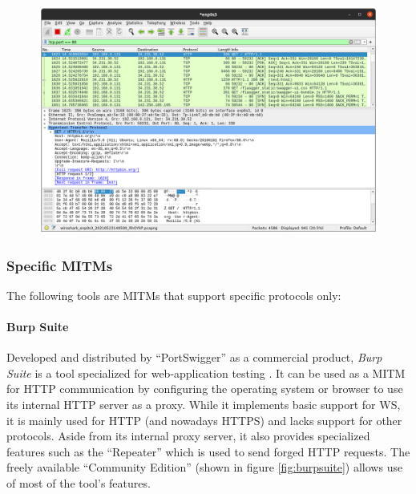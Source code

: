\begin{figure}[h]
    \centering
    \includegraphics[width=14cm]{img/ch03/wireshark.png}
    \label{fig:wireshark}
\end{figure}

\subsubsection{Specific \acp{MITM}}
The following tools are \acp{MITM} that support specific protocols only:
\paragraph{Burp Suite} Developed and distributed by \enquote{PortSwigger} as a commercial product, \emph{Burp Suite} is a tool specialized for web-application testing \cite{burpsuite}. It can be used as a \ac{MITM} for \ac{HTTP} communication by configuring the operating system or browser to use its internal \ac{HTTP} server as a proxy. While it implements basic support for \ac{WS}, it is mainly used for \ac{HTTP} (and nowadays \ac{HTTPS}) and lacks support for other protocols. Aside from its internal proxy server, it also provides specialized features such as the \enquote{Repeater} which is used to send forged \ac{HTTP} requests. The freely available \enquote{Community Edition} (shown in figure \ref{fig:burpsuite}) allows use of most of the tool's features.

